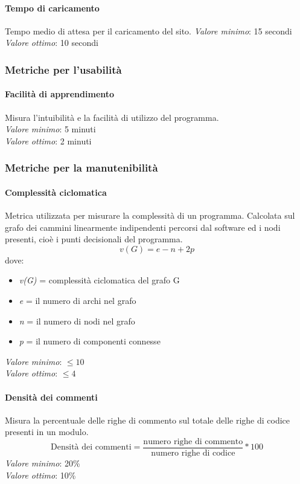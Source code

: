 \paragraph{Tempo di caricamento}
Tempo medio di attesa per il caricamento del sito.
\textit{Valore minimo}: 15 secondi\\
\textit{Valore ottimo}: 10 secondi\\

\subsubsection{Metriche per l'usabilità}
\paragraph{Facilità di apprendimento}
Misura l'intuibilità e la facilità di utilizzo del programma.\\
\textit{Valore minimo}: 5 minuti\\
\textit{Valore ottimo}: 2 minuti\\

\subsubsection{Metriche per la manutenibilità}
\paragraph{Complessità ciclomatica}
Metrica utilizzata per misurare la complessità di un programma. Calcolata sul grafo dei cammini linearmente indipendenti percorsi dal software ed i nodi presenti, cioè i punti decisionali del programma.\\
\begin{equation*}
v(G) = e - n + 2p
\end{equation*}
dove:
\begin{itemize}
	\item \textit{v(G)} = complessità ciclomatica del grafo G
	\item \textit{e} = il numero di archi nel grafo
	\item \textit{n} = il numero di nodi nel grafo
	\item \textit{p} = il numero di componenti connesse
\end{itemize}
\textit{Valore minimo}: $ \le 10 $\\
\textit{Valore ottimo}: $ \le 4 $\\
\paragraph{Densità dei commenti}
Misura la percentuale delle righe di commento sul totale delle righe di codice presenti in un modulo.\\
\begin{equation*}
\text{Densità dei commenti}=\frac{\text{numero righe di commento}}{\text{numero righe di codice}}*100
\end{equation*}
\textit{Valore minimo}: 20\%\\
\textit{Valore ottimo}: 10\%\\

